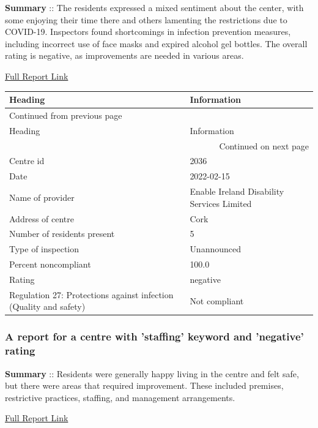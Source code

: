 \documentclass[a4paper,11pt,twoside]{article}
\begin{document}
\textbf{Summary} :: The residents expressed a mixed sentiment about the center, with some enjoying their time there and others lamenting the restrictions due to COVID-19. Inspectors found shortcomings in infection prevention measures, including incorrect use of face masks and expired alcohol gel bottles. The overall rating is negative, as improvements are needed in various areas.

\href{https://www.hiqa.ie/system/files?file=inspectionreports/2036-ard-na-mara-15-february-2022.pdf}{Full Report Link}


\begin{longtable}{p{11cm}|p{5cm}}
Heading & Information\\[0pt]
\hline
\endfirsthead
\multicolumn{2}{l}{Continued from previous page} \\[0pt]
\hline

Heading & Information \\[0pt]

\hline
\endhead
\hline\multicolumn{2}{r}{Continued on next page} \\
\endfoot
\endlastfoot
\hline
Centre id & 2036\\[0pt]
Date & 2022-02-15\\[0pt]
Name of provider & Enable Ireland Disability Services Limited\\[0pt]
Address of centre & Cork\\[0pt]
Number of residents present & 5\\[0pt]
Type of inspection & Unannounced\\[0pt]
Percent noncompliant & 100.0\\[0pt]
Rating & negative\\[0pt]
Regulation 27: Protections against infection (Quality and safety) & Not compliant\\[0pt]
\end{longtable}
\subsubsection{A report for a centre with 'staffing' keyword and 'negative' rating}
\label{sec:org358b208}

\textbf{Summary} :: Residents were generally happy living in the centre and felt safe, but there were areas that required improvement. These included premises, restrictive practices, staffing, and management arrangements.

\href{https://www.hiqa.ie/system/files?file=inspectionreports/7820-tonyglassion-group-home-28-january-2021.pdf}{Full Report Link}
\end{document}
